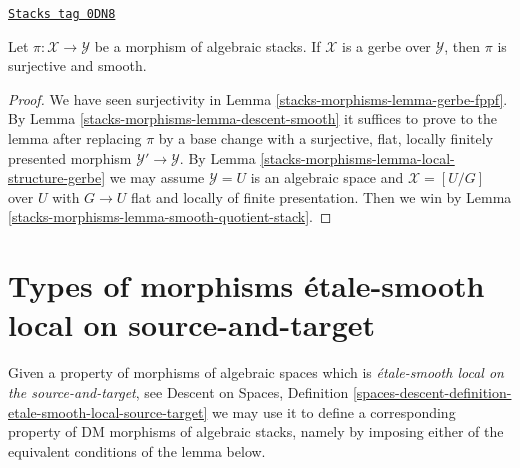 \begin{lemma}
\label{stacks-morphisms-lemma-gerbe-smooth}
\href{https://stacks.math.columbia.edu/tag/0DN8}{\texttt{Stacks tag 0DN8}}

Let $\pi : \mathcal{X} \to \mathcal{Y}$ be a morphism of algebraic stacks.
If $\mathcal{X}$ is a gerbe over $\mathcal{Y}$, then $\pi$ is surjective
and smooth.
\end{lemma}

\begin{proof}
We have seen surjectivity in Lemma \ref{stacks-morphisms-lemma-gerbe-fppf}.
By Lemma \ref{stacks-morphisms-lemma-descent-smooth}
it suffices to prove to the lemma after replacing $\pi$ by a base change
with a surjective, flat, locally finitely presented morphism
$\mathcal{Y}' \to \mathcal{Y}$. By
Lemma \ref{stacks-morphisms-lemma-local-structure-gerbe}
we may assume $\mathcal{Y} = U$ is an algebraic space and
$\mathcal{X} = [U/G]$ over $U$ with $G \to U$ flat and
locally of finite presentation.
Then we win by Lemma \ref{stacks-morphisms-lemma-smooth-quotient-stack}.
\end{proof}

\section{Types of morphisms \'etale-smooth local on source-and-target}
\label{stacks-morphisms-section-etale-smooth-local-source-target}
Given a property of morphisms of algebraic spaces which is
{\it \'etale-smooth local on the source-and-target}, see
Descent on Spaces,
Definition \ref{spaces-descent-definition-etale-smooth-local-source-target}
we may use it to define a corresponding
property of DM morphisms of algebraic stacks, namely by imposing either of
the equivalent conditions of the lemma below.

